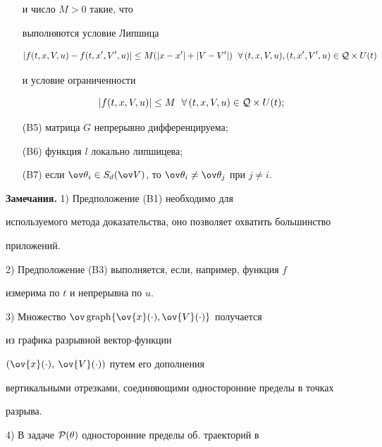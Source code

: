 \begin{itemize}
и число $M>0$ такие, что


выполняются условие Липшица


$$


|f(t,x,V,u)-f(t,x',V',u)| \leq


M(|x-x'|+|V-V'|)\ \; \forall\, (t,x,V,u), (t,x',V',u) \in {\cal


Q}\times U(t)


$$


и условие ограниченности


$$


|f(t,x,V,u)| \leq M \ \;


\forall\, (t,x,V,u) \in {\cal Q}\times U(t);


$$


\item[(B5)] матрица $G$ непрерывно дифференцируема;


\item[(B6)] функция $l$ локально липшицева;


\item[(B7)] если $\ov\theta_{i}\in S_d(\ov


V)$, то $\ov\theta_i\ne\ov\theta_{j}$ при $j\ne i$.


\end{itemize}





{\bf Замечания.} 1) Предположение (B1) необходимо для


используемого метода доказательства, оно позволяет охватить большинство


приложений.





2) Предположение (B3) выполняется, если, например, функция $f$


измерима по $t$ и непрерывна по $u$.





3) Множество $\ov\graph\{\ov{x}(\cdot),\ov{V}(\cdot)\}$ получается


из графика разрывной вектор-функции


$(\ov{x}(\cdot),$ $\ov{V}(\cdot))$ путем его дополнения


вертикальными отрезками, соединяющими односторонние пределы в точках


разрыва.





4) В задаче ${\cal P}(\theta)$ односторонние пределы об. траекторий в



